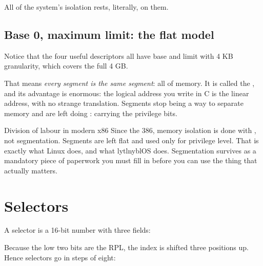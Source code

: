  All of the
system's isolation rests, literally, on them.

\subsection{Base 0, maximum limit: the flat model}

Notice that the four useful descriptors all have base  and limit  with
4 KB granularity, which covers the full 4 GB.

That means \emph{every segment is the same segment}: all of memory. It is called the , and its advantage is enormous: the logical address you write in C is the linear address,
with no strange translation. Segments stop being a way to separate memory and are left doing
: carrying the privilege bits.

\begin{concept}{Division of labour in modern x86}
Since the 386, memory isolation is done with , not segmentation. Segments are left
flat and used only for privilege level. That is exactly what Linux does, and what lytlnyblOS does.
Segmentation survives as a mandatory piece of paperwork you must fill in before you can use the
thing that actually matters.
\end{concept}

\section{Selectors}

A selector is a 16-bit number with three fields:

\begin{center}
\end{center}

Because the low two bits are the RPL, the index is shifted three positions up. Hence selectors go
in steps of eight:

